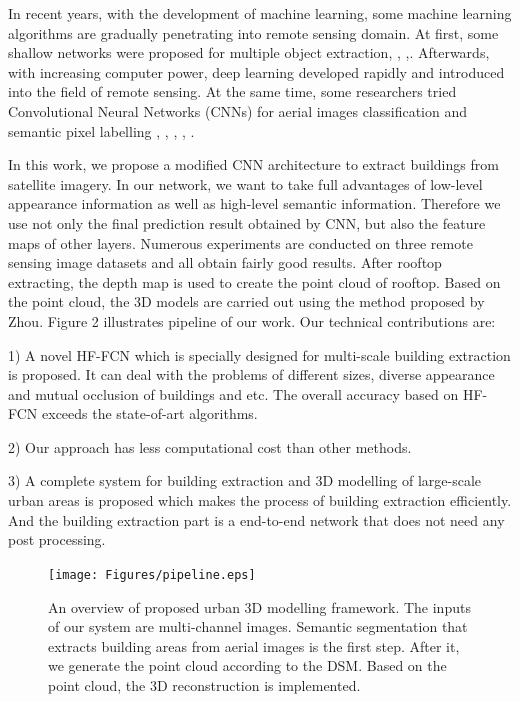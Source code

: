 In recent years, with the development of machine learning, some machine learning algorithms are gradually penetrating into remote sensing domain. At first, some shallow networks were proposed for multiple object extraction\cite{IEEEexample:mnih2013machine}, \cite{IEEEexample:saito2016multiple}, \cite{IEEEexample:alshehhi2017simultaneous},\cite{IEEEexample:zhao2017contextually}. Afterwards, with increasing computer power, deep learning developed rapidly and introduced into the field of remote sensing. At the same time, some researchers tried Convolutional Neural Networks (CNNs) for aerial images classification and semantic pixel labelling \cite{IEEEexample:paisitkriangkrai2015effective}, \cite{IEEEexample:liu2017dense}, \cite{IEEEexample:audebert2017deep}, \cite{IEEEexample:kampffmeyer2017urban}, \cite{IEEEexample:he2017multi}.\par
In this work, we propose a modified CNN architecture to extract buildings from satellite imagery. In our network, we want to take full advantages of low-level appearance information as well as high-level semantic information. Therefore we use not only the final prediction result obtained by CNN, but also the feature maps of other layers. Numerous experiments are conducted on three remote sensing image datasets and all obtain fairly good results. After rooftop extracting, the depth map is used to create the point cloud of rooftop. Based on the point cloud, the 3D models are carried out using the method proposed by Zhou\cite{IEEEexample:zhou20112}. Figure 2 illustrates pipeline of our work. Our technical contributions are:\par
 1) A novel HF-FCN which is specially designed for multi-scale building extraction is proposed. It can deal with the problems of different sizes, diverse appearance and mutual occlusion of buildings and etc. The overall accuracy based on HF-FCN exceeds the state-of-art algorithms.\par
 2) Our approach has less computational cost than other methods.\par
 3) A complete system for building extraction and 3D modelling of large-scale urban areas is proposed which makes the process of building extraction efficiently. And the building extraction part is a end-to-end network that does not need any post processing.
\begin{center}
\begin{figure}
\texttt{[image: Figures/pipeline.eps]}
\caption{An overview of proposed urban 3D modelling framework. The inputs of our system are multi-channel images. Semantic segmentation that extracts building areas from aerial images is the first step. After it, we generate the point cloud according to the DSM. Based on the point cloud, the 3D reconstruction is implemented.}
\label{2}
\end{figure}
\end{center}
